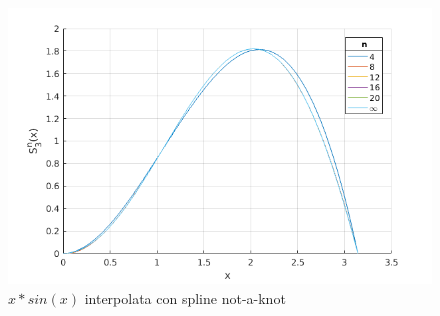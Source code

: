 \begin{figure}
\centering
\includegraphics[scale=0.43]{cap_4/es5/sin_nak}
\caption{$x*sin(x)$ interpolata con spline not-a-knot}
\label{plot_sin_nak}
\end{figure}
